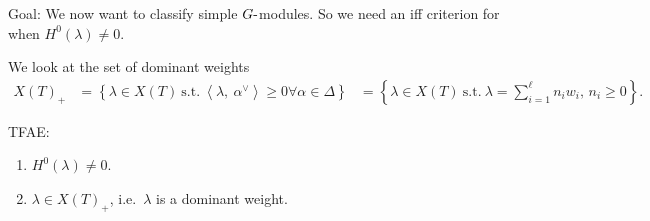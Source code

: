 Goal: We now want to classify simple \(G{\hbox{-}}\)modules. So we need
an iff criterion for when \(H^0(\lambda) \neq 0\).

We look at the set of dominant weights
\begin{align*}   X(T)_+  &= \left\{{\lambda \in X(T) ~{\text{s.t.}}~{\left\langle {\lambda},~{\alpha^\vee} \right\rangle}\geq 0 \forall \alpha\in\Delta}\right\} &= \left\{{\lambda \in X(T) ~{\text{s.t.}}~\lambda = \sum_{i=1}^\ell n_i w_i,\, n_i \geq 0}\right\} .\end{align*}

\begin{theorem}[?]

\begin{theorem}[?]

TFAE:

\begin{enumerate}
\def\labelenumi{\arabic{enumi}.}
\tightlist
\item
  \(H^0(\lambda) \neq 0\).
\item
  \(\lambda \in X(T)_+\), i.e.~\(\lambda\) is a dominant weight.
\end{enumerate}

\end{theorem}

\end{theorem}

